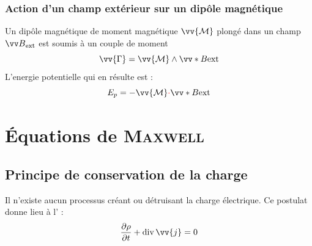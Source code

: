 \documentclass[11pt,a4paper,fleqn,pdftex]{report}
\begin{document}
\subsubsection{Action d'un champ extérieur sur un dipôle magnétique}
\begin{itheorem}
   Un dipôle magnétique de moment magnétique $\vv{\mathcal{M}}$ plongé dans un champ $\B{}_\text{ext}$ est soumis à un couple de moment 
   \begin{equation}
   \vv{\Gamma} = \vv{\mathcal{M}} \wedge \vv*{B}{\text{ext}}
   \end{equation}
   L'energie potentielle qui en résulte est : 
   \begin{equation}
   E_p = - \vv{\mathcal{M}} \textcolor{couleurImp}{\cdot} \vv*{B}{\text{ext}}
   \end{equation}
\end{itheorem}
%
%
\section{Équations de \textsc{Maxwell}}
\subsection{Principe de conservation de la charge} %
\label{sub:principe_de_conservation_de_la_charge}
\begin{itheorem}
Il n'existe aucun processus créant ou détruisant la charge électrique. Ce postulat donne lieu à l' :
   \begin{equation}
   \dfrac{\partial \rho}{\partial t} + \diverg \vv{j} = 0
   \end{equation}
\end{itheorem}
\end{document}
